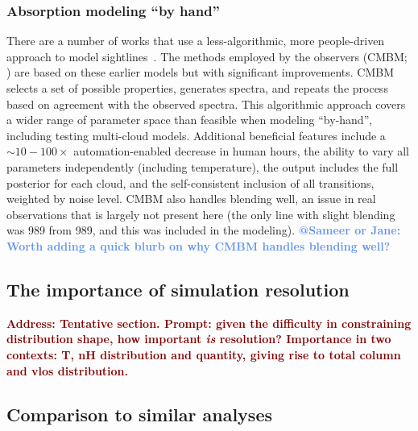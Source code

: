 \documentclass[fleqn,usenatbib]{mnras}
\makeatletter
\newcommand{\todo}[1]{\textcolor{Maroon}{\textbf{Address: #1}}}
\newcommand{\atsameer}[1]{\textcolor{CornflowerBlue}{\textbf{@Sameer or Jane: #1}}}
\makeatother
\begin{document}
\subsubsection{Absorption modeling ``by hand''}

There are a number of works that use a less-algorithmic, more people-driven approach to model sightlines~\citep[e.g.][]{churchill1999multiple, charlton2000anticipating, ding2003quadruple, charlton2003high, ding2003multiphase, zonak2004absorption, ding2005absorption, masiero2005models, lynch2007physical, misawa2008supersolar, lacki2010z, jones2010bare, muzahid2015extreme, richter2018, rosenwasser2018understanding, norris2021Discovery}.
The methods employed by the observers (CMBM; \citealt{Sameer2021, Sameer2022}) are based on these earlier models but with significant improvements.
CMBM selects a set of possible properties, generates spectra, and repeats the process based on agreement with the observed spectra.
This algorithmic approach covers a wider range of parameter space than feasible when modeling ``by-hand'', including testing multi-cloud models.
Additional beneficial features include
a $\sim 10-100 \times$ automation-enabled decrease in human hours,
the ability to vary all parameters independently (including temperature),
the output includes the full posterior for each cloud,
and the self-consistent inclusion of all transitions, weighted by noise level.
CMBM also handles blending well, an issue in real observations that is largely not present here
(the only line with slight blending was  989 from  989, and this was included in the modeling).
\atsameer{Worth adding a quick blurb on why CMBM handles blending well?}

\subsection{The importance of simulation resolution}

\todo{Tentative section.
Prompt: given the difficulty in constraining distribution shape, how important \textit{is} resolution?
Importance in two contexts:
T, nH distribution and quantity, giving rise to total column
and vlos distribution.
}


\subsection{Comparison to similar analyses}
\end{document}
